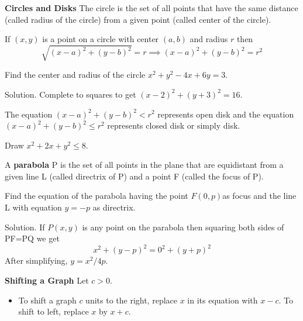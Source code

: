 \documentclass[../main.tex]{subfiles}
\begin{document}
\textbf{Circles and Disks}
The circle is the set of all points that have the same distance (called radius of the circle) from a given point (called center of the circle).

If $(x,y)$ is a point on a circle with center $(a,b)$ and radius $r$ then
\[
  \sqrt{(x-a)^2+(y-b)^2} = r \implies
  (x-a)^2+(y-b)^2 = r^2
\]

\begin{example}
  Find the center and radius of the circle $x^2+y^2-4x+6y=3$.

  Solution. Complete to squares to get $(x-2)^2+(y+3)^2=16$.
\end{example}

The equation $(x-a)^2+(y-b)^2 < r^2$ represents open disk and the equation $(x-a)^2+(y-b)^2 \le r^2$ represents closed disk or simply disk.
\begin{example}
  Draw $x^2+2x+y^2 \le 8$.
\end{example}
A \textbf{parabola} P is the set of all points in the plane that are equidistant from a given line L (called directrix of P) and a point F (called the focus of P).
\begin{center}
\end{center}

\begin{example}
  Find the equation of the parabola having the point $F(0,p)$as focus and the line L with equation $y=-p$ as directrix.

  Solution. If $P(x,y)$ is any point on the parabola then squaring both sides of PF=PQ we get
  \[
    x^2 + (y-p)^2 = 0^2 + (y+p)^2
  \]
  After simplifying, $y=x^2/4p$.
\end{example}

\textbf{Shifting a Graph}
Let $c>0$.

\begin{itemize}
  \item To shift a graph $c$ units to the right, replace $x$ in its equation with $x-c$. To shift to left, replace $x$ by $x+c$.

\end{itemize}
\end{document}
